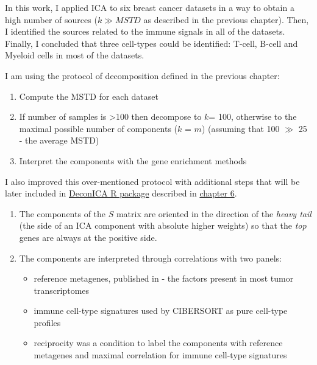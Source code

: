 \documentclass[12pt,]{book}
\providecommand{\tightlist}{%
  \setlength{\itemsep}{0pt}\setlength{\parskip}{0pt}}
\theoremstyle{definition}
\theoremstyle{definition}
\theoremstyle{definition}
\theoremstyle{remark}
\begin{document}
In this work, I applied ICA to six breast cancer datasets in a way to
obtain a high number of sources (\(k \gg MSTD\) as described in the
previous chapter). Then, I identified the sources related to the immune
signals in all of the datasets. Finally, I concluded that three
cell-types could be identified: T-cell, B-cell and Myeloid cells in most
of the datasets.

I am using the protocol of decomposition defined in the previous
chapter:

\begin{enumerate}
\def\labelenumi{\arabic{enumi}.}
\tightlist
\item
  Compute the MSTD for each dataset
\item
  If number of samples is \textgreater{}100 then decompose to \(k\)=
  100, otherwise to the maximal possible number of components (\(k\) =
  \(m\)) (assuming that 100 \(\gg\) 25 - the average MSTD)
\item
  Interpret the components with the gene enrichment methods
\end{enumerate}

I also improved this over-mentioned protocol with additional steps that
will be later included in
\href{https://urszulaczerwinska.github.io/DeconICA/}{DeconICA R package}
described in \protect\hyperlink{deconica}{chapter 6}.

\begin{enumerate}
\def\labelenumi{\arabic{enumi}.}
\item
  The components of the \(S\) matrix are oriented in the direction of
  the \emph{heavy tail} (the side of an ICA component with absolute
  higher weights) so that the \emph{top} genes are always at the
  positive side.
\item
  The components are interpreted through correlations with two panels:

  \begin{itemize}
  \tightlist
  \item
    reference metagenes, published in \citep{Biton2014} - the factors
    present in most tumor transcriptomes
  \item
    immune cell-type signatures used by CIBERSORT \citep{Newman2015} as
    pure cell-type profiles
  \item
    reciprocity was a condition to label the components with reference
    metagenes and maximal correlation for immune cell-type signatures
  \end{itemize}
\end{enumerate}
\end{document}

